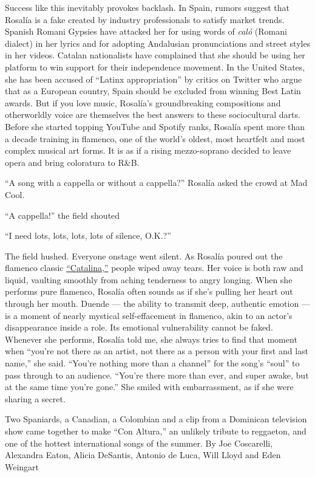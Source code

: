 Success like this inevitably provokes backlash. In Spain, rumors suggest
that Rosalía is a fake created by industry professionals to satisfy
market trends. Spanish Romani Gypsies have attacked her for using words
of \emph{caló} (Romani dialect) in her lyrics and for adopting
Andalusian pronunciations and street styles in her videos. Catalan
nationalists have complained that she should be using her platform to
win support for their independence movement. In the United States, she
has been accused of ``Latinx appropriation'' by critics on Twitter who
argue that as a European country, Spain should be excluded from winning
Best Latin awards. But if you love music, Rosalía's groundbreaking
compositions and otherworldly voice are themselves the best answers to
these sociocultural darts. Before she started topping YouTube and
Spotify ranks, Rosalía spent more than a decade training in flamenco,
one of the world's oldest, most heartfelt and most complex musical art
forms. It is as if a rising mezzo-soprano decided to leave opera and
bring coloratura to R\&B.

``A song with a cappella or without a cappella?'' Rosalía asked the
crowd at Mad Cool.

``A cappella!'' the field shouted

``I need lots, lots, lots, lots of silence, O.K.?''

The field hushed. Everyone onstage went silent. As Rosalía poured out
the flamenco classic
\href{https://www.youtube.com/watch?v=0OMwDZUWl5g}{``Catalina,''} people
wiped away tears. Her voice is both raw and liquid, vaulting smoothly
from aching tenderness to angry longing. When she performs pure
flamenco, Rosalía often sounds as if she's pulling her heart out through
her mouth. Duende --- the ability to transmit deep, authentic emotion
--- is a moment of nearly mystical self-effacement in flamenco, akin to
an actor's disappearance inside a role. Its emotional vulnerability
cannot be faked. Whenever she performs, Rosalía told me, she always
tries to find that moment when ``you're not there as an artist, not
there as a person with your first and last name,'' she said. ``You're
nothing more than a channel'' for the song's ``soul'' to pass through to
an audience. ``You're there more than ever, and super awake, but at the
same time you're gone.'' She smiled with embarrassment, as if she were
sharing a secret.

Two Spaniards, a Canadian, a Colombian and a clip from a Dominican
television show came together to make ``Con Altura,'' an unlikely
tribute to reggaeton, and one of the hottest international songs of the
summer. By Joe Coscarelli, Alexandra Eaton, Alicia DeSantis, Antonio de
Luca, Will Lloyd and Eden Weingart

